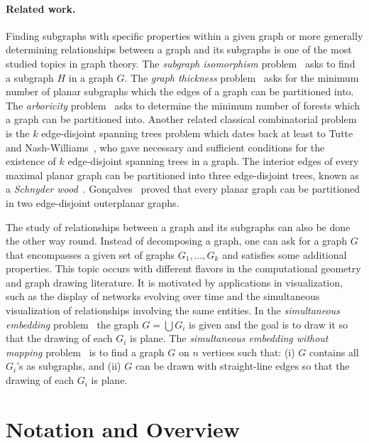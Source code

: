 \documentclass[11pt,a4paper,colorlinks=true,urlcolor=blue,citecolor=red]{article}
\theoremstyle{plain}
\newcommand{\subsubparagraph}[1]{\paragraph{#1}}
\begin{document}
\subsubparagraph{Related work.} Finding subgraphs with specific
properties within a given graph or more generally determining
relationships between a graph and its subgraphs is one of the most
studied topics in graph theory. The \emph{subgraph isomorphism}
problem~\cite{Epp-JGAA-99,GareyJ79,Ullmann76} asks to find a subgraph
$H$ in a graph $G$. The \emph{graph thickness} problem~\cite{mutzel}
asks for the minimum number of planar subgraphs which the edges of a
graph can be partitioned into. The \emph{arboricity}
problem~\cite{Epp-IPL-94} asks to determine the minimum number of
forests which a graph can be partitioned into. Another related classical
combinatorial problem is the $k$ edge-disjoint spanning trees problem
which dates back at least to Tutte~\cite{t-pdgncf-61} and
Nash-Williams~\cite{nw-edstfg-61}, who gave necessary and sufficient
conditions for the existence of $k$ edge-disjoint spanning trees in a
graph. The interior edges of every maximal planar graph can be
partitioned into three edge-disjoint trees, known as a \emph{Schnyder
  wood}~\cite{s-pgpd-89}. Gon\c{c}alves~\cite{1060666} proved that every
planar graph can be partitioned in two edge-disjoint outerplanar graphs.

The study of relationships between a graph and its subgraphs can also be
done the other way round. Instead of decomposing a graph, one can ask for a graph $G$ that encompasses a given set of
graphs $G_1,\ldots,G_k$ and satisfies some additional properties. This
topic occurs with different flavors in the computational geometry and
graph drawing literature. It is motivated by applications in
visualization, such as the display of networks evolving over time and
the simultaneous visualization of relationships involving the same
entities. In the \emph{simultaneous embedding}
problem~\cite{BrassCDEEIKLM07}
the graph $G=\bigcup G_i$ is given and the goal is to draw it so that
the drawing of each $G_i$ is plane. The \emph{simultaneous embedding
  without mapping} problem~\cite{BrassCDEEIKLM07} is to find a graph $G$
on $n$ vertices such that: (i) $G$ contains all $G_i$'s as subgraphs,
and (ii) $G$ can be drawn with straight-line edges so that the drawing
of each $G_i$ is plane.

\section{Notation and Overview}\label{sec:def_overview}
\end{document}
